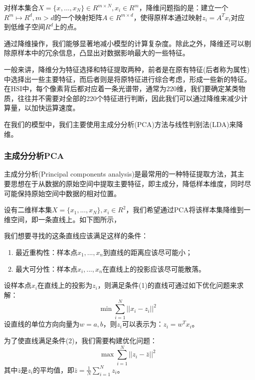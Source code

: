 \documentclass[12pt,a4paper]{article}
\begin{document}
\begin{definition}
对样本集合$X = \{x_{}, ..., x_{N}\} \in R^{m \times N}, x_{i} \in R^{m}$，降维问题指的是：建立一个$R^{m} \longmapsto R^{d}, m > d$的一个映射矩阵$A \in R^{m \times d}$，使得原样本通过映射$z_{i} = A^{T}x_{i}$对应到低维子空间$R^{d}$上的点。
\end{definition}

通过降维操作，我们能够显著地减小模型的计算复杂度。除此之外，降维还可以剔除原样本中的冗余信息，凸显出对数据影响最大的一些特征。

一般来讲，降维分为特征选择和特征提取两种，前者是在原有特征(后者称为属性)中选择出一些主要特征，而后者则是将原特征进行综合考虑，形成一些新的特征。在HSI中，每个像素背后都对应着一条光谱带，通常为220维，我们要确定某类物质，往往并不需要对全部的220个特征进行判断，因此我们可以通过降维来减少计算量，以加快运算速度。

在我们的模型中，我们主要使用主成分分析(PCA)方法与线性判别法(LDA)来降维。

\subsubsection{主成分分析PCA}
主成分分析(Principal components analysis)是最常用的一种特征提取方法，其主要思想在于从数据的原始空间中提取主要特征，即主成分，降低样本维度，同时尽可能保持原始空间中数据的相对位置。

设有二维样本集$X = \{x_{1}, ... , x_{N}\}, x_{i} \in R^{2}$，我们希望通过PCA将该样本集降维到一维空间，即一条直线上。如下图所示，
\begin{figure}[H] 
\label{fig:2} 
\end{figure} 
我们想要寻找的这条直线应该满足这样的条件：
\begin{enumerate}[(1)]
\item 最近重构性：样本点$x_{1}, ... , x_{n}$到直线的距离应该尽可能小；
\item 最大可分性：样本点$x_{i}, ... , x_{n}$在直线上的投影应该尽可能散落。
\end{enumerate}
设样本点$x_{i}$在直线上的投影为$z_{i}$，则满足条件(1)的直线可通过如下优化问题来求解：
\begin{equation}
\label{eq16}
\min \sum_{i = 1}^{N}||x_{i} - z_{i}||^{2}
\end{equation}
设直线的单位方向向量为$w = {a, b}$，则$z_{i}$可以表示为：$z_{i} = w^{T}x_{i}$。

为了使直线满足条件(2)，我们需要构建优化问题：
\begin{equation}
\label{eq17}
\max \sum_{i = 1}^{N}||z_{i} - \bar{z}||^{2}
\end{equation}
其中$\bar{z}$是$z_{i}$的平均值，即$\bar{z} = \frac{1}{N}\sum_{i = 1}^{N}z_{i}$。
\end{document}
